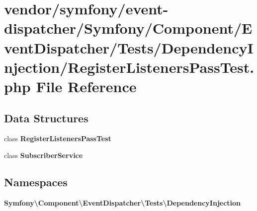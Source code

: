 \section{vendor/symfony/event-\/dispatcher/\+Symfony/\+Component/\+Event\+Dispatcher/\+Tests/\+Dependency\+Injection/\+Register\+Listeners\+Pass\+Test.php File Reference}
\label{_register_listeners_pass_test_8php}
\subsection*{Data Structures}
\begin{DoxyCompactItemize}
\item 
class {\bf Register\+Listeners\+Pass\+Test}
\item 
class {\bf Subscriber\+Service}
\end{DoxyCompactItemize}
\subsection*{Namespaces}
\begin{DoxyCompactItemize}
\item 
 {\bf Symfony\textbackslash{}\+Component\textbackslash{}\+Event\+Dispatcher\textbackslash{}\+Tests\textbackslash{}\+Dependency\+Injection}
\end{DoxyCompactItemize}
